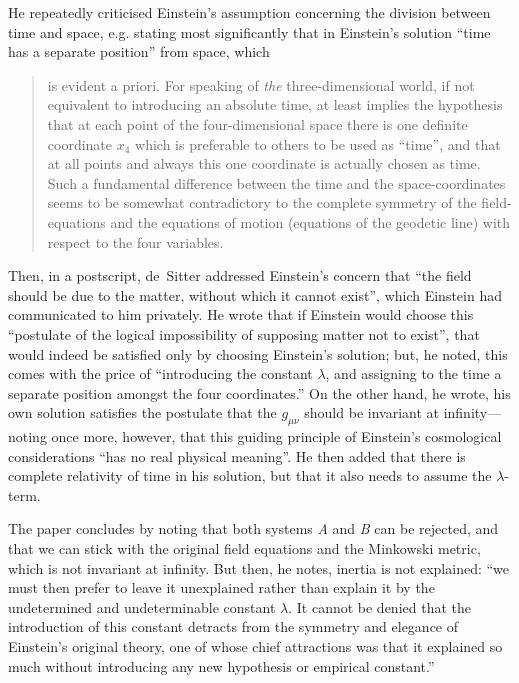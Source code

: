 \documentclass[12 pt]{article}
\begin{document}
He repeatedly criticised Einstein's assumption concerning the division between time and space, e.g. stating most significantly that in Einstein's solution ``time has a separate position'' from space, which
\begin{quote}
is evident a priori. For speaking of \textit{the} three-dimensional world, if not equivalent to introducing an absolute time, at least implies the hypothesis that at each point of the four-dimensional space there is one definite coordinate $x_4$ which is preferable to others to be used as ``time'', and that at all points and always this one coordinate is actually chosen as time. Such a fundamental difference between the time and the space-coordinates seems to be somewhat contradictory to the complete symmetry of the field-equations and the equations of motion (equations of the geodetic line) with respect to the four variables.
\end{quote}

Then, in a postscript, de~Sitter addressed Einstein's concern that ``the field should be due to the matter, without which it cannot exist'', which Einstein had communicated to him privately. He wrote that if Einstein would choose this ``postulate of the logical impossibility of supposing matter not to exist'', that would indeed be satisfied only by choosing Einstein's solution; but, he noted, this comes with the price of ``introducing the constant $\lambda$, and assigning to the time a separate position amongst the four coordinates.'' On the other hand, he wrote, his own solution satisfies the postulate that the $g_{\mu\nu}$ should be invariant at infinity---noting once more, however, that this guiding principle of Einstein's cosmological considerations ``has no real physical meaning''. He then added that there is complete relativity of time in his solution, but that it also needs to assume the $\lambda$-term. 

The paper concludes by noting that both systems \textit{A} and \textit{B} can be rejected, and that we can stick with the original field equations and the Minkowski metric, which is not invariant at infinity. But then, he notes, inertia is not explained: ``we must then prefer to leave it unexplained rather than explain it by the undetermined and undeterminable constant $\lambda$. It cannot be denied that the introduction of this constant detracts from the symmetry and elegance of Einstein's original theory, one of whose chief attractions was that it explained so much without introducing any new hypothesis or empirical constant.''
\end{document}
